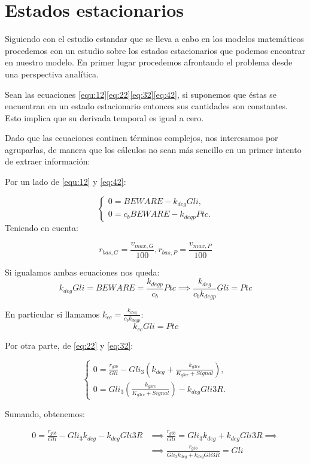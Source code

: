 \section{Estados estacionarios}\label{apartado3.4}
Siguiendo con el estudio estandar que se lleva a cabo en los modelos matemáticos procedemos con un estudio sobre los estados estacionarios que podemos encontrar en nuestro modelo. En primer lugar procedemos afrontando el problema desde una perspectiva analítica. 

Sean las ecuaciones \ref{equ:12}\ref{eq:22}\ref{eq:32}\ref{eq:42}, si suponemos que éstas se encuentran en un estado estacionario entonces sus cantidades son constantes. Esto implica que su derivada temporal es igual a cero.

Dado que las ecuaciones continen términos complejos, nos interesamos por agruparlas, de manera que los cálculos no sean más sencillo en un primer intento de extraer información:

Por un lado de \ref{equ:12} y \ref{eq:42}:

$$\begin{cases} 0 = BEWARE-k_{deg}Gli, \\0= c_bBEWARE-k_{degp}Ptc. \end{cases}$$
Teniendo en cuenta:

$$
r_{bas,G}=\frac{v_{max,G}}{100},r_{bas,P}=\frac{v_{max,P}}{100}
$$

Si igualamos ambas ecuaciones nos queda:
\begin{equation*}
k_{deg}Gli=BEWARE=\frac{k_{degp}}{c_b}Ptc \implies \frac{k_{deg}}{c_bk_{degp}}Gli=Ptc
\end{equation*}

En particular si llamamos $k_{cc}=\frac{k_{deg}}{c_bk_{degp}}$:
\begin{equation}
k_{cc}Gli=Ptc
\label{gli-ptc2}
\end{equation}


Por otra parte, de \ref{eq:22} y \ref{eq:32}:



$$\begin{cases} 0 = \frac{r_{g3b}}{Gli}-Gli_3\left(k_{deg}+\frac{k_{g3rc}}{K_{g3rc}+Signal}\right), \\0=Gli_3\left(\frac{k_{g3rc}}{K_{g3rc}+Signal}\right)-k_{deg}Gli3R. \end{cases}$$

Sumando, obtenemos:

\begin{equation}
\begin{split}
0=\frac{r_{g3b}}{Gli}-Gli_3k_{deg}-k_{deg}Gli3R & \implies \frac{r_{g3b}}{Gli}=Gli_3k_{deg}+k_{deg}Gli3R\implies
\\
& \implies \frac{r_{g3b}}{Gli_3k_{deg}+k_{deg}Gli3R}=Gli
\end{split}
\label{gli3gli2}
\end{equation}

